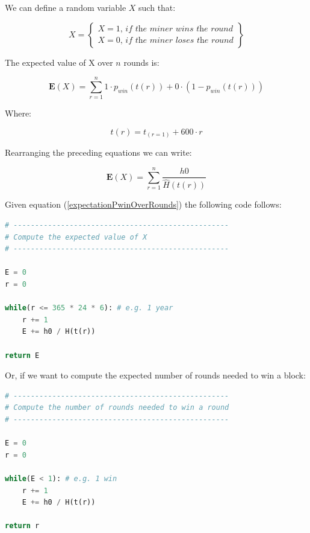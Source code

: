 \documentclass{article}
\begin{document}
We can define a random variable $X$ such that:

\begin{equation}
X = \left\{
        \begin{array}{ll}
            X = 1 \textit{, if the miner wins the round} \\
            X = 0 \textit{, if the miner loses the round}
        \end{array}
    \right \} \label{rndX}
\end{equation}

The expected value of X over $n$ rounds is:

\begin{equation}
    \mathbf{E}(X) = \displaystyle\sum_{r=1}^{n} 1 \cdot p_{win}(t(r)) + 0 \cdot ( 1 - p_{win}(t(r))) \label{eq5}
\end{equation}

Where:

\begin{equation}
    t(r) = t_{(r=1)} + 600 \cdot r \label{eq6}
\end{equation}

Rearranging the preceding equations we can write:

\begin{equation}
    \mathbf{E}(X) = \displaystyle\sum_{r=1}^{n} \frac{h0}{\widehat{H}(t(r))} \label{expectationPwinOverRounds}
\end{equation}

Given equation (\ref{expectationPwinOverRounds}) the following code follows:

\begin{lstlisting}[language=Python]
# --------------------------------------------------
# Compute the expected value of X
# --------------------------------------------------

E = 0
r = 0

while(r <= 365 * 24 * 6): # e.g. 1 year
    r += 1
    E += h0 / H(t(r))

return E
\end{lstlisting}

Or, if we want to compute the expected number of rounds needed to win a block:

\begin{lstlisting}[language=Python]
# --------------------------------------------------
# Compute the number of rounds needed to win a round
# --------------------------------------------------

E = 0
r = 0

while(E < 1): # e.g. 1 win
    r += 1
    E += h0 / H(t(r))

return r
\end{lstlisting}
\end{document}
